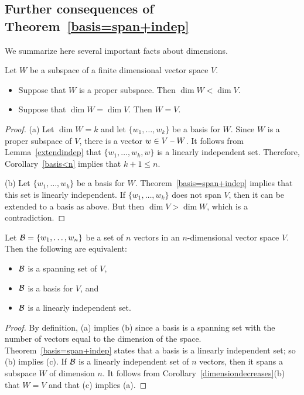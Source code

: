 \documentclass{ximera}
\begin{document}
\subsection*{Further consequences of Theorem~\ref{basis=span+indep}}

We summarize here several important facts about dimensions.

\begin{corollary}  \label{dimensiondecreases}
Let $W$ be a subspace of a finite dimensional vector space $V$.
\begin{itemize}
\item[(a)]   Suppose that $W$ is a proper subspace.
Then $\dim W < \dim V$.
\item[(b)]   Suppose that $\dim W = \dim V$.  Then $W=V$.
\end{itemize}
\end{corollary}

\begin{proof}
(a) Let $\dim W = k$ and let $\{w_1,\ldots,w_k\}$ be a basis for
$W$.  Since $W$ is a proper subspace of $V$, there is a vector
$w\in V\;\mbox{--}\; W$.  It follows from Lemma~\ref{extendindep} that
$\{w_1,\ldots,w_k,w\}$ is a linearly independent set.  Therefore,
Corollary~\ref{basis<n} implies that $k+1\le n$.

(b) Let $\{w_1,\ldots,w_k\}$ be a basis for $W$.
Theorem~\ref{basis=span+indep} implies that this set is linearly
independent.  If $\{w_1,\ldots,w_k\}$ does not span $V$, then it
can be extended to a basis as above.  But then $\dim V > \dim W$,
which is a contradiction.  \end{proof}

\begin{corollary} \label{C:dim=n}
Let ${\cal B}=\{w_1,\ldots,w_n\}$ be a set of $n$ vectors in an
$n$-dimensional vector space $V$.  Then the following are equivalent:
\begin{itemize}
\item[(a)]  ${\cal B}$ is a spanning set of $V$, 
\item[(b)]  ${\cal B}$ is a basis for $V$, and 
\item[(c)] ${\cal B}$ is a linearly independent set.
\end{itemize}
\end{corollary}

\begin{proof}    By definition, (a) implies (b) since a basis is a spanning
set with the number of vectors equal to the dimension of the space.
Theorem~\ref{basis=span+indep} states that a basis is a linearly
independent set; so (b) implies (c). If ${\cal B}$ is a linearly
independent set of $n$ vectors, then it spans a subspace $W$ of
dimension $n$.  It follows from Corollary~\ref{dimensiondecreases}(b)
that $W=V$ and that (c) implies (a).  \end{proof}
\end{document}
